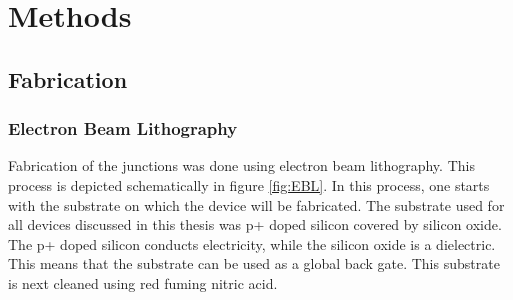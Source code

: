 \section{Methods}
\label{section:Methods}

\subsection{Fabrication}


\subsubsection{Electron Beam Lithography}
Fabrication of the junctions was done using electron beam lithography. This process is depicted schematically in figure \ref{fig:EBL}.
In this process, one starts with the substrate on which the device will be fabricated. The substrate used for all devices discussed in this thesis was p+ doped silicon covered by silicon oxide. The p+ doped silicon conducts electricity, while the silicon oxide is a dielectric. This means that the substrate can be used as a global back gate. This substrate is next cleaned using red fuming nitric acid.

